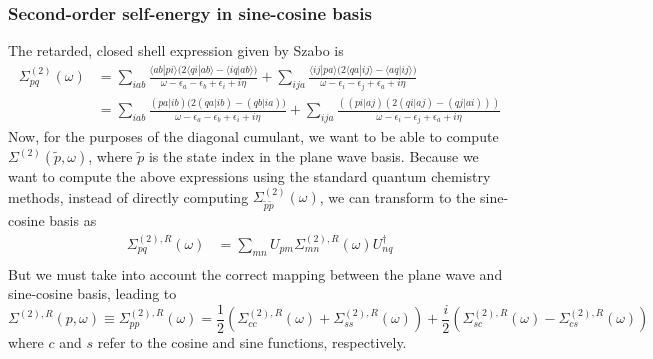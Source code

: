 \subsubsection{Second-order self-energy in sine-cosine basis}
The retarded, closed shell expression given by Szabo is
\begin{align}
    \Sigma^{(2)}_{pq}(\omega) &= \sum_{iab} \frac{\langle ab | pi \rangle \Big(2 \langle qi | ab \rangle - \langle iq | ab \rangle\Big)}{\omega - \epsilon_a - \epsilon_b + \epsilon_i + i \eta} + \sum_{ija} \frac{\langle ij | pa \rangle \Big(2 \langle qa | ij \rangle - \langle aq | ij \rangle\Big)}{\omega - \epsilon_i - \epsilon_j + \epsilon_a + i \eta} \\
    & = \sum_{iab} \frac{(pa|ib)\Big(2(qa|ib) - (qb|ia)\Big)}{\omega - \epsilon_a - \epsilon_b + \epsilon_i + i \eta} + \sum_{ija} \frac{\left( (pi|aj)(2(qi|aj) - (qj|ai)) \right)}{\omega - \epsilon_i - \epsilon_j + \epsilon_a + i \eta} 
\end{align}
Now, for the purposes of the diagonal cumulant, we want to be able to compute $\Sigma ^{(2)}(\tilde{p}, \omega)$, where $\tilde{p}$ is the state index in the plane wave basis. Because we want to compute the above expressions using the standard quantum chemistry methods, instead of directly computing $\Sigma^{(2)}_{\tilde{p}\tilde{p}}(\omega)$, we can transform to the sine-cosine basis as
\begin{align}
{\Sigma}^{(2),R}_{pq}(\omega) & = \sum_{m n} U_{p m} {\Sigma}^{(2),R}_{mn}(\omega) U_{n q}^{\dagger} \\
\end{align}
But we must take into account the correct mapping between the plane wave and sine-cosine basis, leading to
\begin{equation}
{\Sigma}^{(2),R}(p, \omega)\equiv{\Sigma}^{(2),R}_{pp}(\omega)=\frac{1}{2}\left( \Sigma ^{(2),R}_{c c}(\omega )+\Sigma^{(2),R}_{s s}(\omega )\right)+\frac{i}{2}\left(\Sigma^{(2),R}_{s c}(\omega )-\Sigma^{(2),R}_{c s}(\omega )\right)
\end{equation}
where $c$ and $s$ refer to the cosine and sine functions, respectively. 
